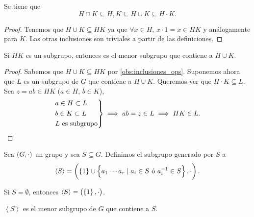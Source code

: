 \begin{obs} \label{obs:inclusiones_ops}
    Se tiene que
    \[
        H \cap K \subseteq H, K \subseteq H \cup K \subseteq H \cdot K.
    \]
\end{obs}

\begin{proof}
    Tenemos que $H \cup K \subseteq HK$ ya que $\forall x \in H, \, x\cdot1 = x \in HK$
    y análogamente para $K$. Las otras inclusiones son triviales a partir de las definiciones.
\end{proof}

\begin{obs}
    Si $HK$ es un subgrupo, entonces es el menor subgrupo que contiene a $H \cup K$. 
\end{obs}

\begin{proof}
    Sabemos que $H \cup K \subseteq HK$ por \ref{obs:inclusiones_ops}.
    Suponemos ahora que $L$ es un subgrupo de $G$ que contiene a $H \cup K$. Queremos ver que
    $ H \cdot K \subseteq L$. Sea $z = ab \in HK$ ($a \in H$, $b \in K$),
    \[
        \begin{rcases}
            a \in H \subset L \\
            b \in K \subset L \\
            L \text{ es subgrupo}
        \end{rcases}
        \implies ab = z \in L \implies HK \in L.
    \]
\end{proof}

\begin{defi}
        Sea $\left( G, \cdot\right)$ un grupo y sea $S\subseteq G$. Definimos el subgrupo generado por $S$ a
        \[
            \left<S\right> = \left( \left\{ 1 \right\} \cup \left\{a_1 \cdots a_r \mid a_i \in S \text{ ó } a^{-1}_i \in S\right\}, \cdot \right).
        \]
\end{defi}

\begin{obs}
    Si $S = \emptyset$, entonces $\left<S\right> = \left( \left\{1\right\}, \cdot \right)$.
\end{obs}

\begin{obs}
    $\left<S\right>$ es el menor subgrupo de $G$ que contiene a $S$.
\end{obs}

